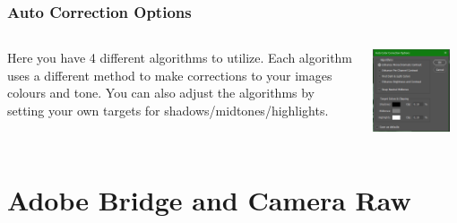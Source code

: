 \documentclass{beamer}
\begin{document}
					\begin{frame}
			\frametitle{Auto Correction Options}
				\begin{columns}
					\begin{outline}
						\1 Here you have 4 different algorithms to utilize.
						\1 Each algorithm uses a different method to make corrections to your images colours and tone.
						\1 You can also adjust the algorithms by setting your own targets for shadows/midtones/highlights.
					\end{outline}
					\begin{center}
						\includegraphics[width=0.9\textwidth]{images/auto correction options.png}
					\end{center}
				\end{columns}

		\end{frame}		
		
		\section{Adobe Bridge and Camera Raw}
\end{document}
